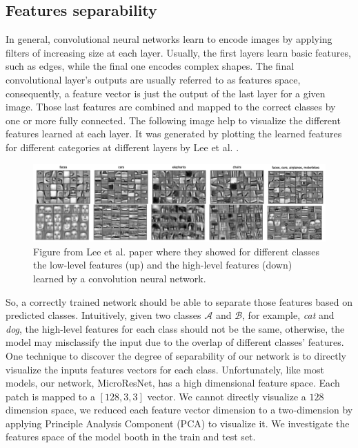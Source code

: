 \documentclass[../document.tex]{subfiles}
\begin{document}
\subsection{Features separability}
\label{sec: features-separability}
In general, convolutional neural networks learn to encode images by applying filters of increasing size at each layer. Usually, the first layers learn basic features, such as edges, while the final one encodes complex shapes. The final convolutional layer's outputs are usually referred to as features space, consequently, a feature vector is just the output of the last layer for a given image. Those last features are combined and mapped to the correct classes by one or more fully connected. The following image help to visualize the different features learned at each layer. It was generated by plotting the learned features for different categories at different layers by 
Lee et al. \cite{deepbelief}. 
\begin{figure} [htbp]
    \centering
    \includegraphics[width=\linewidth]{../img/5/deep_belief.png}
    \caption{Figure from Lee et al. \cite{deepbelief} paper where they showed for different classes the low-level features (up) and the high-level features (down) learned by a convolution neural network.}
\end{figure}
So, a correctly trained network should be able to separate those features based on predicted classes. Intuitively, given two classes $\mathcal{A}$ and $\mathcal{B}$, for example, \emph{cat} and \emph{dog}, the high-level features for each class should not be the same, otherwise, the model may misclassify the input due to the overlap of different classes' features. 
One technique to discover the degree of separability of our network is to directly visualize the inputs features vectors for each class. Unfortunately, like most models, our network, MicroResNet, has a high dimensional feature space. Each patch is mapped to a  $[128, 3, 3 ]$ vector. We cannot directly visualize a $128$ dimension space, we reduced each feature vector dimension to a two-dimension by applying Principle Analysis Component (PCA) \cite{pca} to visualize it. We investigate the features space of the model booth in the train and test set.
\end{document}
